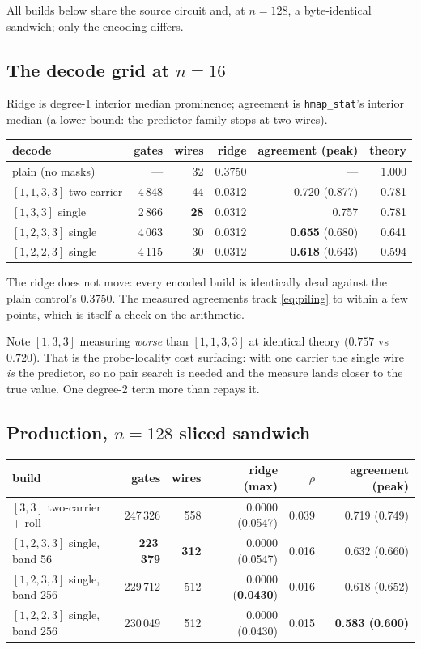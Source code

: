 \documentclass[11pt]{article}
\newcommand{\code}[1]{\texttt{#1}}
\begin{document}
All builds below share the source circuit and, at $n{=}128$, a byte-identical
sandwich; only the encoding differs.

\subsection{The decode grid at $n{=}16$}

Ridge is degree-1 interior median prominence; agreement is \code{hmap\_stat}'s
interior median (a lower bound: the predictor family stops at two wires).

\begin{center}
\begin{tabular}{lrrrrr}
\toprule
decode & gates & wires & ridge & agreement (peak) & theory \\
\midrule
plain (no masks) & --- & 32 & 0.3750 & --- & 1.000 \\
$[1,1,3,3]$ two-carrier & 4\,848 & 44 & 0.0312 & 0.720 (0.877) & 0.781 \\
$[1,3,3]$ single & 2\,866 & \textbf{28} & 0.0312 & 0.757 & 0.781 \\
$[1,2,3,3]$ single & 4\,063 & 30 & 0.0312 & \textbf{0.655} (0.680) & 0.641 \\
$[1,2,2,3]$ single & 4\,115 & 30 & 0.0312 & \textbf{0.618} (0.643) & 0.594 \\
\bottomrule
\end{tabular}
\end{center}

The ridge does not move: every encoded build is identically dead against the
plain control's $0.3750$. The measured agreements track \eqref{eq:piling} to
within a few points, which is itself a check on the arithmetic.

Note $[1,3,3]$ measuring \emph{worse} than $[1,1,3,3]$ at identical theory
($0.757$ vs $0.720$). That is the probe-locality cost surfacing: with one
carrier the single wire \emph{is} the predictor, so no pair search is needed
and the measure lands closer to the true value. One degree-2 term more than
repays it.

\subsection{Production, $n{=}128$ sliced sandwich}
\label{sec:prod}

\begin{center}
\begin{tabular}{lrrrrr}
\toprule
build & gates & wires & ridge (max) & $\rho$ & agreement (peak) \\
\midrule
$[3,3]$ two-carrier + roll & 247\,326 & 558 & 0.0000 (0.0547) & 0.039 & 0.719 (0.749) \\
$[1,2,3,3]$ single, band 56 & \textbf{223\,379} & \textbf{312} & 0.0000 (0.0547) & 0.016 & 0.632 (0.660) \\
$[1,2,3,3]$ single, band 256 & 229\,712 & 512 & 0.0000 (\textbf{0.0430}) & 0.016 & 0.618 (0.652) \\
$[1,2,2,3]$ single, band 256 & 230\,049 & 512 & 0.0000 (0.0430) & 0.015 & \textbf{0.583 (0.600)} \\
\bottomrule
\end{tabular}
\end{center}
\end{document}
